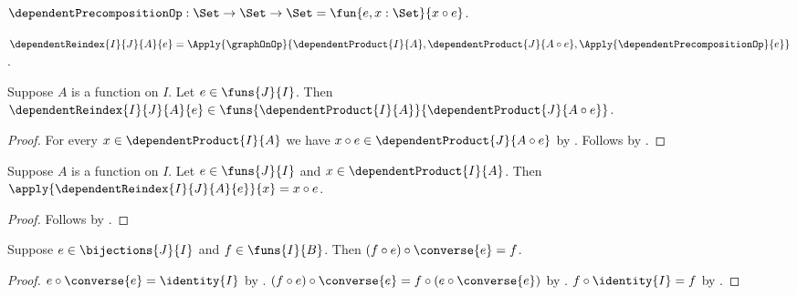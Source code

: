 \begin{definition}\label{dependent_precomposition_op}
    $\dependentPrecompositionOp:\Set\to\Set\to\Set
        =\fun{e,x:\Set}{x\circ e}$.
\end{definition}

\begin{definition}\label{dependent_reindex}
    $\dependentReindex{I}{J}{A}{e}
        =\Apply{\graphOnOp}{
            \dependentProduct{I}{A},
            \dependentProduct{J}{A\circ e},
            \Apply{\dependentPrecompositionOp}{e}}$.
\end{definition}

\begin{proposition}\label{dependent_reindex_type}
    Suppose $A$ is a function on $I$.
    Let $e\in\funs{J}{I}$.
    Then
        $\dependentReindex{I}{J}{A}{e}\in
            \funs{\dependentProduct{I}{A}}{
                \dependentProduct{J}{A\circ e}}$.
\end{proposition}
\begin{proof}
    For every $x\in\dependentProduct{I}{A}$ we have
        $x\circ e\in\dependentProduct{J}{A\circ e}$ by
        .
    Follows by
        .
\end{proof}

\begin{proposition}\label{dependent_reindex_apply}
    Suppose $A$ is a function on $I$.
    Let $e\in\funs{J}{I}$ and $x\in\dependentProduct{I}{A}$.
    Then $\apply{\dependentReindex{I}{J}{A}{e}}{x}=x\circ e$.
\end{proposition}
\begin{proof}
    Follows by
        .
\end{proof}

\begin{theorem}\label{bijective_reindex_round_trip}
    Suppose $e\in\bijections{J}{I}$ and $f\in\funs{I}{B}$.
    Then $(f\circ e)\circ\converse{e}=f$.
\end{theorem}
\begin{proof}
    $e\circ\converse{e}=\identity{I}$ by
        .
    $(f\circ e)\circ\converse{e}
        =f\circ(e\circ\converse{e})$ by .
    $f\circ\identity{I}=f$ by .
\end{proof}


